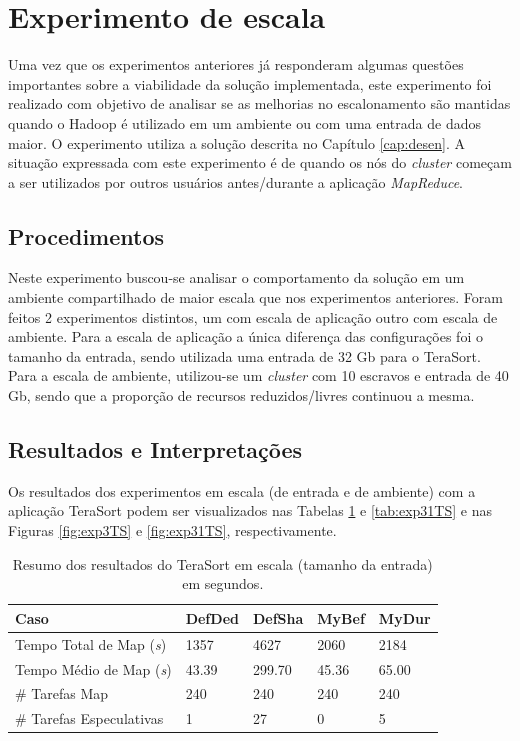 \section{Experimento de escala}
Uma vez que os experimentos anteriores já responderam algumas questões importantes sobre a viabilidade da solução implementada, este experimento foi realizado com objetivo de analisar se as melhorias no escalonamento são mantidas quando o Hadoop é utilizado em um ambiente ou com uma entrada de dados maior. O experimento utiliza a solução descrita no Capítulo \ref{cap:desen}. A situação expressada com este experimento é de quando os nós do \textit{cluster} começam a ser utilizados por outros usuários antes/durante a aplicação \textit{MapReduce}.

\subsection{Procedimentos}
Neste experimento buscou-se analisar o comportamento da solução em um ambiente compartilhado de maior escala que nos experimentos anteriores. Foram feitos 2 experimentos distintos, um com escala de aplicação outro com escala de ambiente. Para a escala de aplicação a única diferença das configurações foi o tamanho da entrada, sendo utilizada uma entrada de 32 Gb para o TeraSort. Para a escala de ambiente, utilizou-se um \textit{cluster} com 10 escravos e entrada de 40 Gb, sendo que a proporção de recursos reduzidos/livres continuou a mesma. 

\subsection{Resultados e Interpretações}
Os resultados dos experimentos em escala (de entrada e de ambiente) com a aplicação TeraSort podem ser visualizados nas Tabelas \ref{tab:exp3TS} e \ref{tab:exp31TS} e nas Figuras \ref{fig:exp3TS} e \ref{fig:exp31TS}, respectivamente.

\begin{table}[h!]
	\caption{Resumo dos resultados do TeraSort em escala (tamanho da entrada) em segundos.} \label{tab:exp3TS}
	\begin{tabular*}{\hsize}{l|llll} %
		\textbf{Caso} & \textbf{DefDed} & \textbf{DefSha} & \textbf{MyBef} & \textbf{MyDur}\\
		\hline
		Tempo Total de Map ({\it{s}}) & 1357 & 4627 & 2060 & 2184 \\
		Tempo Médio de Map ({\it{s}}) & 43.39 & 299.70 & 45.36 & 65.00 \\
		\# Tarefas Map & 240 & 240 & 240 & 240 \\
		\# Tarefas Especulativas & 1 & 27 & 0 & 5 \\
	\end{tabular*}
\end{table}
%
%


